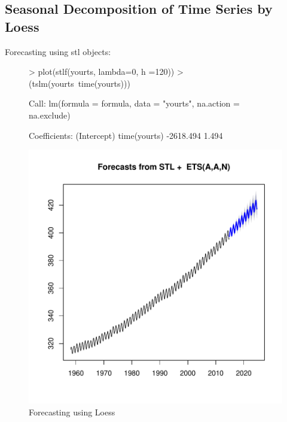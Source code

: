 \documentclass[11pt, a4paper]{article} %
\begin{document}
\subsection{Seasonal Decomposition of Time Series by Loess}
Forecasting using stl objects:
\begin{figure}[H]
\centering
\begin{Schunk}
\begin{Sinput}
> plot(stlf(yourts, lambda=0, h =120))
> (tslm(yourts~time(yourts)))
\end{Sinput}
\begin{Soutput}
Call:
lm(formula = formula, data = "yourts", na.action = na.exclude)

Coefficients:
 (Intercept)  time(yourts)  
   -2618.494         1.494  
\end{Soutput}
\end{Schunk}
\includegraphics{sweaveclean-025}
\caption{Forecasting using Loess}
\end{figure}
\end{document}

